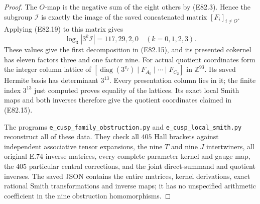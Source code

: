 \begin{proof}
The $O$-map is the negative sum of the eight others
by (E82.3). Hence the subgroup $\mathscr I$ is
exactly the image of the saved concatenated matrix
$[F_i]_{i\ne O}$. Applying (E82.19) to this matrix
gives
\[
       \log_3|3^k\mathscr I|=117,29,2,0
                \quad(k=0,1,2,3).
 \tag{E82.21}
\]
These values give the first decomposition in
(E82.15), and its presented cokernel has eleven
factors three and one factor nine.
For actual quotient coordinates form the integer
column lattice of
$[\operatorname{diag}(3^{v_j})\mid F_{A_0}\mid\cdots\mid F_{C_2}]$
in $\mathbb Z^{93}$. Its saved Hermite basis has
determinant $3^{13}$. Every presentation column
lies in it; the finite index $3^{13}$ just computed
proves equality of the lattices. Its exact local
Smith maps and both inverses therefore give the
quotient coordinates claimed in (E82.15).

The programs \texttt{e\_cusp\_family\_obstruction.py}
and \texttt{e\_cusp\_local\_smith.py} reconstruct all
of these data. They check all $405$ Hall brackets
against independent associative tensor expansions,
the nine $T$ and nine $J$ intertwiners, all original
E.74 inverse matrices, every complete parameter
kernel and gauge map, the $405$ particular central
corrections, and the joint direct-summand and quotient
inverses. The saved JSON contains the entire matrices,
kernel derivations, exact rational Smith transformations
and inverse maps; it has no unspecified arithmetic
coefficient in the nine obstruction homomorphisms.
\end{proof}
